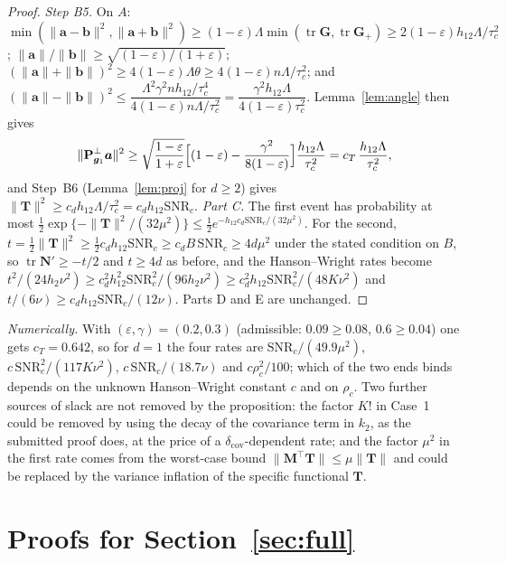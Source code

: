 \documentclass[11pt]{article}
\theoremstyle{definition}
\newcommand{\bT}{\mathbf{T}}
\newcommand{\bM}{\mathbf{M}}
\newcommand{\bN}{\mathbf{N}}
\newcommand{\tr}{\operatorname{tr}}
\begin{document}
\begin{proof}
\emph{Step B5.} On $A$: $\min(\|\bm a-\bm b\|^2,\|\bm a+\bm b\|^2)\ge(1-\varepsilon)\Lambda\min(\tr\mathbf G,\tr\mathbf G_+)\ge2(1-\varepsilon)h_{12}\Lambda/\tau_c^2$; $\|\bm a\|/\|\bm b\|\ge\sqrt{(1-\varepsilon)/(1+\varepsilon)}$; $(\|\bm a\|+\|\bm b\|)^2\ge4(1-\varepsilon)\Lambda\theta\ge4(1-\varepsilon)n\Lambda/\tau_c^2$; and $(\|\bm a\|-\|\bm b\|)^2\le\dfrac{\Lambda^2\gamma^2nh_{12}/\tau_c^4}{4(1-\varepsilon)n\Lambda/\tau_c^2}=\dfrac{\gamma^2h_{12}\Lambda}{4(1-\varepsilon)\tau_c^2}$. Lemma~\ref{lem:angle} then gives
\[
\|\mathbf P^\perp_{\bm{g}_1}\bm a\|^2\ge\sqrt{\frac{1-\varepsilon}{1+\varepsilon}}\Big[(1-\varepsilon)-\frac{\gamma^2}{8(1-\varepsilon)}\Big]\frac{h_{12}\Lambda}{\tau_c^2}=c_T\,\frac{h_{12}\Lambda}{\tau_c^2},
\]
and Step~B6 (Lemma~\ref{lem:proj} for $d\ge2$) gives $\|\bT\|^2\ge c_dh_{12}\Lambda/\tau_c^2=c_dh_{12}\mathrm{SNR}_c$.
\emph{Part C.} The first event has probability at most $\tfrac12\exp\{-\|\bT\|^2/(32\mu^2)\}\le\tfrac12e^{-h_{12}c_d\mathrm{SNR}_c/(32\mu^2)}$. For the second, $t=\tfrac12\|\bT\|^2\ge\tfrac12c_dh_{12}\mathrm{SNR}_c\ge c_dB\,\mathrm{SNR}_c\ge4d\mu^2$ under the stated condition on $B$, so $\tr\bN'\ge-t/2$ and $t\ge4d$ as before, and the Hanson--Wright rates become $t^2/(24h_2\nu^2)\ge c_d^2h_{12}^2\mathrm{SNR}_c^2/(96h_2\nu^2)\ge c_d^2h_{12}\mathrm{SNR}_c^2/(48K\nu^2)$ and $t/(6\nu)\ge c_dh_{12}\mathrm{SNR}_c/(12\nu)$. Parts D and E are unchanged.
\end{proof}

\emph{Numerically.} With $(\varepsilon,\gamma)=(0.2,0.3)$ (admissible: $0.09\ge0.08$, $0.6\ge0.04$) one gets $c_T=0.642$, so for $d=1$ the four rates are $\mathrm{SNR}_c/(49.9\mu^2)$, $c\,\mathrm{SNR}_c^2/(117K\nu^2)$, $c\,\mathrm{SNR}_c/(18.7\nu)$ and $c\rho_c^2/100$; which of the two ends binds depends on the unknown Hanson--Wright constant $c$ and on $\rho_c$. Two further sources of slack are not removed by the proposition: the factor $K!$ in Case~1 could be removed by using the decay of the covariance term in $k_2$, as the submitted proof does, at the price of a $\delta_{\mathrm{cov}}$-dependent rate; and the factor $\mu^2$ in the first rate comes from the worst-case bound $\|\bM^\top\bT\|\le\mu\|\bT\|$ and could be replaced by the variance inflation of the specific functional $\bT$.

\section{Proofs for Section~\ref{sec:full}}\label{app:full}
\end{document}

